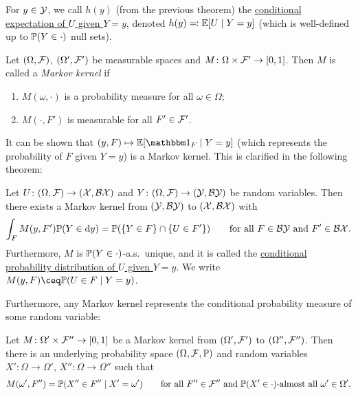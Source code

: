 \begin{definition}
	For $y \in \mathcal Y$, we call $h(y)$ (from the previous theorem) the \uline{conditional expectation of $U$ given $Y = y$}, denoted $h(y) \eqqcolon \mathbb E[U \mid Y = y]$ (which is well-defined up to $\mathbb P(Y \in \cdot)$ null sets). 
	
\end{definition}

\begin{definition}
	Let $(\Omega, \mathcal F)$, $(\Omega', \mathcal F')$ be measurable spaces and $M \colon \Omega \times \mathcal F' \to [0, 1]$. Then $M$ is called a \emph{Markov kernel} if
	\begin{enumerate}
		\item $M(\omega, \cdot)$ is a probability measure for all $\omega \in \Omega$;
		\item $M(\cdot, F')$ is measurable for all $F' \in \mathcal F'$. 
	\end{enumerate}
\end{definition}

It can be shown that $(y, F) \mapsto \EE[\ind_F \mid Y= y]$ (which represents the probability of $F$ given $Y = y$) is a Markov kernel. This is clarified in the following theorem:

\begin{theorem}
Let $U \colon (\Omega, \mathcal F) \to (\mathcal X, \mathcal B\mathcal X)$ and $Y \colon (\Omega, \mathcal F) \to (\mathcal Y, \mathcal B\mathcal Y)$ be random variables. Then there exists a Markov kernel from $(\mathcal Y, \mathcal B\mathcal Y)$ to $(\mathcal X, \mathcal B\mathcal X)$ with
\[
\int_F M(y, F') \mathbb P(Y \in \dd{y}) = \mathbb P(\qty{Y\in F} \cap \qty{U \in F'}) \qquad \text{for all $F \in \mathcal B\mathcal Y$ and $F' \in \mathcal B\mathcal X$}. 
\]
Furthermore, $M$ is $\mathbb P(Y \in \cdot)$-a.s.\ unique, and it is called the \uline{conditional probability distribution of $U$ given $Y = y$}. We write $M(y, F) \ceq \PP(U \in F \mid Y = y)$. 
\end{theorem}

Furthermore, any Markov kernel represents the conditional probability measure of some random variable:
\begin{theorem}
	Let $M \colon \Omega' \times \mathcal F'' \to [0, 1]$ be a Markov kernel from $(\Omega', \mathcal F')$ to $(\Omega'', \mathcal F'')$. Then there is an underlying probability space $(\Omega, \mathcal F, \mathbb P)$ and random variables $X' \colon \Omega \to \Omega'$, $X'' \colon \Omega \to \Omega''$ such that
	\[
	M(\omega', F'') = \mathbb P(X'' \in F'' \mid X' = \omega') \qquad\text{for all $F'' \in \mathcal F''$ and $\mathbb P(X' \in \cdot)$-almost all $\omega' \in \Omega'$}. 
	\]
\end{theorem}


